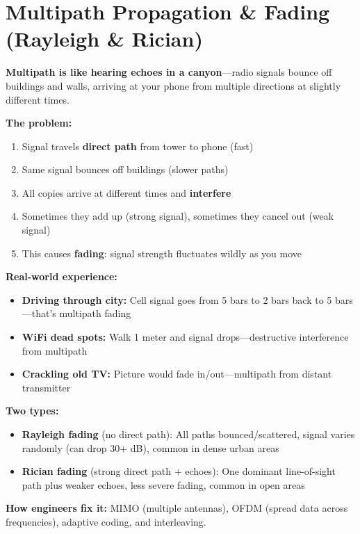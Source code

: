 \chapter{Multipath Propagation \& Fading (Rayleigh \& Rician)}
\label{ch:multipath-propagation-fading}

\begin{nontechnical}
\textbf{Multipath is like hearing echoes in a canyon}---radio signals bounce off buildings and walls, arriving at your phone from multiple directions at slightly different times.

\textbf{The problem:}
\begin{enumerate}
\item Signal travels \textbf{direct path} from tower to phone (fast)
\item Same signal bounces off buildings (slower paths)
\item All copies arrive at different times and \textbf{interfere}
\item Sometimes they add up (strong signal), sometimes they cancel out (weak signal)
\item This causes \textbf{fading}: signal strength fluctuates wildly as you move
\end{enumerate}

\textbf{Real-world experience:}
\begin{itemize}
\item \textbf{Driving through city:} Cell signal goes from 5 bars to 2 bars back to 5 bars---that's multipath fading
\item \textbf{WiFi dead spots:} Walk 1 meter and signal drops---destructive interference from multipath
\item \textbf{Crackling old TV:} Picture would fade in/out---multipath from distant transmitter
\end{itemize}

\textbf{Two types:}
\begin{itemize}
\item \textbf{Rayleigh fading} (no direct path): All paths bounced/scattered, signal varies randomly (can drop 30+ dB), common in dense urban areas
\item \textbf{Rician fading} (strong direct path + echoes): One dominant line-of-sight path plus weaker echoes, less severe fading, common in open areas
\end{itemize}

\textbf{How engineers fix it:} MIMO (multiple antennas), OFDM (spread data across frequencies), adaptive coding, and interleaving.
\end{nontechnical}

